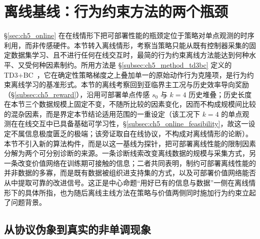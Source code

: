
\section{离线基线：行为约束方法的两个瓶颈}\label{sec:ch5_td3bc}

\S\ref{sec:ch5_online} 在在线情形下把可部署性能的瓶颈定位于策略对单点观测的时序利用，而非传感硬件。本节转入离线情形，考察当策略只能从既有控制器采集的固定数据集学习、且不进行任何在线交互时，最简的行为约束离线方法能达到何种水平、又受何种因素制约。所用方法是 \S\ref{subsec:ch5_method_td3bc} 定义的 TD3+BC~\citep{fujimoto2021td3bc}，它在确定性策略梯度之上叠加单一的原始动作行为克隆项，是行为约束离线学习的基准形式。本节的离线考察回到亚临界主工况与历史效率导向奖励（\S\ref{subsec:ch5_reward}），沿用可部署单点传感 $s_0$ 与 $k=4$ 历史堆叠；历史长度在本节三个数据规模上固定不变，不随所比较的因素变化，因而不构成规模间比较的混杂因素，而是界定本节结论适用范围的一重设定（该工况下 $k=4$ 的单点观测在在线交互中已具备基础可学习性，\S\ref{subsec:ch5_online_feasibility}，故这一设定不属信息极度匮乏的极端；该旁证取自在线协议，不构成对离线情形的论断）。本节不引入新的算法构件，而是以这一基线为探针，把可部署离线性能的限制因素分解为两个可分别诊断的来源。一条诊断线索改变离线数据的规模与采集方式，另一条改变价值网络在训练期可接触的信息；二者共同表明，制约可部署离线性能的并非数据的多寡，而是既有数据被组织进支持集的方式，以及可部署价值网络能否从中提取可靠的改进信号。这正是中心命题“用好已有的信息与数据”一侧在离线情形下的具体所指，也为随后离线主线方法在策略与价值两侧同时施加行为约束立起了问题背景。

\subsection{从协议伪象到真实的非单调现象}\label{subsec:ch5_td3bc_phenomenon}


